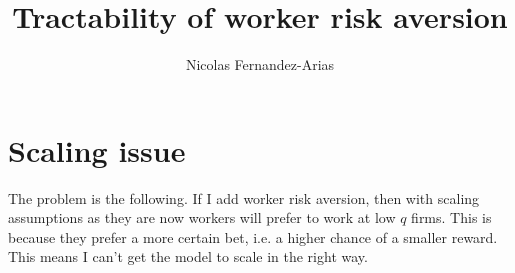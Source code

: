 \documentclass[12pt,english]{article}
\theoremstyle{remark}
\begin{document}
	
\title{Tractability of worker risk aversion}
\author{Nicolas Fernandez-Arias}
\maketitle

\section{Scaling issue}

The problem is the following. If I add worker risk aversion, then with scaling assumptions as they are now workers will prefer to work at low $q$ firms. This is because they prefer a more certain bet, i.e. a higher chance of a smaller reward. This means I can't get the model to scale in the right way. 
\end{document}
